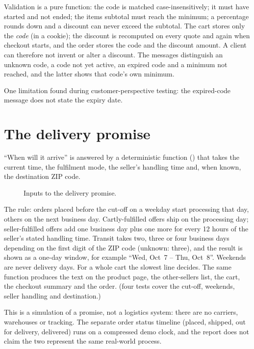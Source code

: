 Validation is a pure function: the code is matched case-insensitively; it must have started and not ended; the items subtotal must reach the minimum; a percentage rounds down and a discount can never exceed the subtotal. The cart stores only the \emph{code} (in a cookie); the discount is recomputed on every quote and again when checkout starts, and the order stores the code and the discount amount. A client can therefore not invent or alter a discount. The messages distinguish an unknown code, a code not yet active, an expired code and a minimum not reached, and the latter shows that code's own minimum. \tagimpl{} \tagtest{}

One limitation found during customer-perspective testing: the expired-code message does not state the expiry date.

\section{The delivery promise}

``When will it arrive'' is answered by a deterministic function () that takes the current time, the fulfilment mode, the seller's handling time and, when known, the destination ZIP code.

\begin{figure}[H]
\centering
{}
\caption{Inputs to the delivery promise.}
\label{fig:delivery}
\end{figure}

The rule: orders placed before the cut-off on a weekday start processing that day, others on the next business day. Cartly-fulfilled offers ship on the processing day; seller-fulfilled offers add one business day plus one more for every 12 hours of the seller's stated handling time. Transit takes two, three or four business days depending on the first digit of the ZIP code (unknown: three), and the result is shown as a one-day window, for example ``Wed, Oct~7 -- Thu, Oct~8''. Weekends are never delivery days. For a whole cart the slowest line decides. The same function produces the text on the product page, the other-sellers list, the cart, the checkout summary and the order. \tagimpl{} \tagtest{} (four tests cover the cut-off, weekends, seller handling and destination.)

This is a simulation of a promise, not a logistics system: there are no carriers, warehouses or tracking. The separate order status timeline (placed, shipped, out for delivery, delivered) runs on a compressed demo clock, and the report does not claim the two represent the same real-world process.
